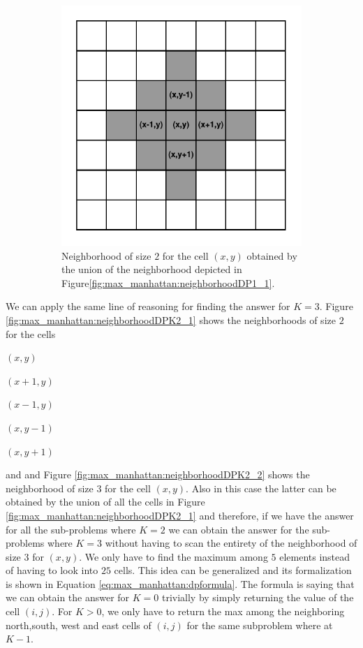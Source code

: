 \begin{figure}
	\begin{subfigure}[t]{0.4\textwidth}
		\centering
		\includegraphics[width=\textwidth]{sources/max_manhattan/images/neighborhoodDP1_2}
		\caption[]{Neighborhood of size $2$ for the cell $(x,y)$ obtained by the union of the
		neighborhood depicted in Figure\ref{fig:max_manhattan:neighborhoodDP1_1}.}
		\label{fig:max_manhattan:neighborhoodDP1_2}
	 \end{subfigure}
	 \label{}
	 \caption{}
\end{figure}

We can apply the same line of reasoning for finding the answer for $K=3$. Figure
\ref{fig:max_manhattan:neighborhoodDPK2_1} shows  the neighborhoods of size $2$ for the cells 
\begin{itemize*}
	\item $(x,y)$
	\item $(x+1,y)$
	\item $(x-1,y)$
	\item $(x,y-1)$
	\item $(x,y+1)$ \end{itemize*} and and Figure \ref{fig:max_manhattan:neighborhoodDPK2_2} shows
the neighborhood of size $3$ for the cell $(x,y)$. Also in this case the latter can be obtained by
the union of all the cells in Figure \ref{fig:max_manhattan:neighborhoodDPK2_1} and therefore, if we
have the answer for all the sub-problems where $K=2$ we can obtain the answer for the sub-problems
where $K=3$ without having to scan the entirety of the neighborhood of size $3$ for $(x,y)$. We only
have to find the maximum among $5$ elements instead of having to look into $25$ cells. This idea can
be generalized and its formalization is shown in Equation \ref{eq:max_manhattan:dpformula}. The
formula is saying that we can obtain the answer for $K=0$ trivially by simply returning the value of
the cell $(i,j)$. For $K>0$, we only have to return the max among the neighboring north,south, west
and east cells of $(i,j)$ for the same subproblem where at $K-1$.

